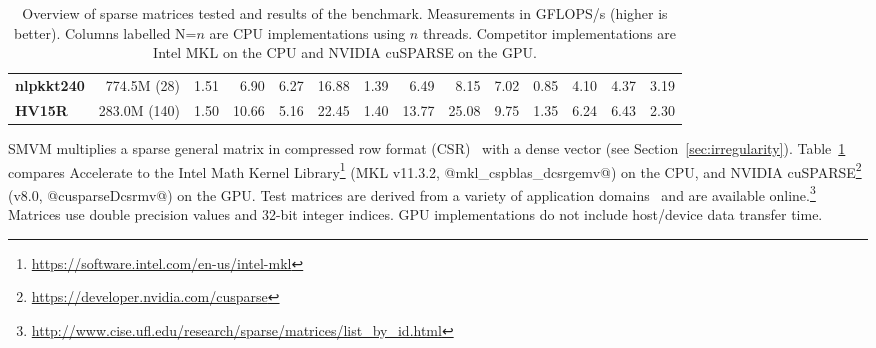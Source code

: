 \begin{landscape}
\begin{table}
\begin{center}
{\begin{tabular}{lrrrrrrrrrrrrr}
  \textbf{nlpkkt240}    & 774.5M (28)
                        & 1.51
                        & 6.90
                        & 6.27
                        & 16.88
                        & 1.39
                        & 6.49
                        & 8.15
                        & 7.02
                        & 0.85
                        & 4.10
                        & 4.37
                        & 3.19
                        \\

  \textbf{HV15R}        & 283.0M (140)
                        & 1.50
                        & 10.66
                        & 5.16
                        & 22.45
                        & 1.40
                        & 13.77
                        & 25.08
                        & 9.75
                        & 1.35
                        & 6.24
                        & 6.43
                        & 2.30
                        \\

  \bottomrule
\end{tabular}}
\end{center}
\caption{Overview of sparse matrices tested and results of the benchmark.
Measurements in GFLOPS/s (higher is better). Columns labelled N=$n$ are CPU
implementations using $n$ threads. Competitor implementations are Intel MKL on
the CPU and NVIDIA cuSPARSE on the GPU.}
\label{tab:smvm}
\end{table}
\end{landscape}

SMVM multiplies a sparse general matrix in compressed row format
(CSR)~\cite{Chatterjee:1990vj} with a dense vector (see Section~\ref{sec:irregularity}). Table~\ref{tab:smvm} compares Accelerate to the Intel Math Kernel Library\footnote{\url{https://software.intel.com/en-us/intel-mkl}} (MKL v11.3.2,
@mkl_cspblas_dcsrgemv@) on the CPU, and NVIDIA cuSPARSE\footnote{\url{https://developer.nvidia.com/cusparse}} (v8.0,
@cusparseDcsrmv@) on the GPU. Test matrices are derived from a variety of
application domains~\cite{sparse_matrix_collection} and are available
online.\footnote{\url{http://www.cise.ufl.edu/research/sparse/matrices/list_by_id.html}}
Matrices use double precision values and 32-bit integer indices. GPU
implementations do not include host/device data transfer time.


